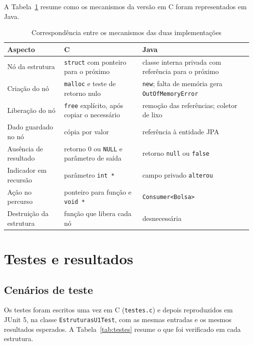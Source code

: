 \documentclass[12pt,a4paper,oneside]{report}
\newcommand{\fonte}[1][Elaborado pelos autores (2026).]{\par\vspace{2pt}{\centering\small Fonte: #1\par}\vspace{6pt}}
\newcommand{\cod}[1]{\texttt{#1}}
\begin{document}
A Tabela~\ref{tab:sintese} resume como os mecanismos da versão em C foram representados em Java.

\begin{table}[H]
\caption{Correspondência entre os mecanismos das duas implementações}
\label{tab:sintese}
\small
\begin{tabularx}{\textwidth}{@{}p{4.2cm}XX@{}}
\toprule
\textbf{Aspecto} & \textbf{C} & \textbf{Java} \\
\midrule
Nó da estrutura & \cod{struct} com ponteiro para o próximo & classe interna privada com referência para o próximo \\
Criação do nó & \cod{malloc} e teste de retorno nulo & \cod{new}; falta de memória gera \cod{OutOfMemoryError} \\
Liberação do nó & \cod{free} explícito, após copiar o necessário & remoção das referências; coletor de lixo \\
Dado guardado no nó & cópia por valor & referência à entidade JPA \\
Ausência de resultado & retorno 0 ou \cod{NULL} e parâmetro de saída & retorno \cod{null} ou \cod{false} \\
Indicador em recursão & parâmetro \cod{int *} & campo privado \cod{alterou} \\
Ação no percurso & ponteiro para função e \cod{void *} & \cod{Consumer<Bolsa>} \\
Destruição da estrutura & função que libera cada nó & desnecessária \\
\bottomrule
\end{tabularx}
\fonte
\end{table}

\chapter{Testes e resultados}

\section{Cenários de teste}

Os testes foram escritos uma vez em C (\cod{testes.c}) e depois reproduzidos em JUnit 5, na classe \cod{EstruturasU1Test}, com as mesmas entradas e os mesmos resultados esperados. A Tabela~\ref{tab:testes} resume o que foi verificado em cada estrutura.
\end{document}
